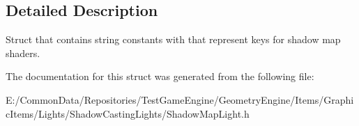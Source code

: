 \subsection{Detailed Description}
Struct that contains string constants with that represent keys for shadow map shaders. 

The documentation for this struct was generated from the following file\+:\begin{DoxyCompactItemize}
\item 
E\+:/\+Common\+Data/\+Repositories/\+Test\+Game\+Engine/\+Geometry\+Engine/\+Items/\+Graphic\+Items/\+Lights/\+Shadow\+Casting\+Lights/Shadow\+Map\+Light.\+h\end{DoxyCompactItemize}
